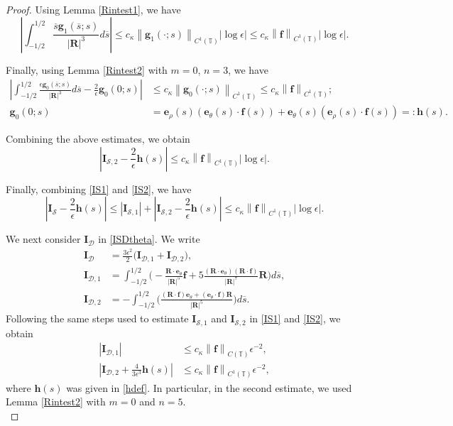 \documentclass[11pt]{article}
\numberwithin{equation}{section}
\newcommand{\T}{\mathbb{T}}
\newcommand{\bars}{\overline s}
\newcommand{\be}{\bm{e}}
\newcommand{\abs}[1]{\left\lvert #1 \right\rvert}
\newcommand{\norm}[1]{\left\lVert #1 \right\rVert}
\newcommand{\mc}[1]{\mathcal{#1}}
\theoremstyle{definition}
\begin{document}
\begin{proof}
Using Lemma \ref{Rintest1}, we have
\[ \abs{\int_{-1/2}^{1/2} \frac{\bars \bm{g}_1(\bars;s)}{\abs{\bm{R}}^3}d\bars}
\le c_\kappa\norm{\bm{g}_1(\cdot;s)}_{C^1(\T)}\abs{\log \epsilon}\le c_\kappa\norm{\bm{f}}_{C^1(\T)}\abs{\log \epsilon}. \]

Finally, using Lemma \ref{Rintest2} with $m=0$, $n=3$, we have 
\begin{equation}\label{hdef}
\begin{split}
\abs{\int_{-1/2}^{1/2} \frac{\epsilon \bm{g}_0(\bars;s)}{\abs{\bm{R}}^3}d\bars - \frac{2}{\epsilon}\bm{g}_0(0; s)}
&\le c_\kappa\norm{\bm{g}_0(\cdot;s)}_{C^1(\T)}\le c_\kappa\norm{\bm{f}}_{C^1(\T)};\\
\bm{g}_0(0;s)&=\be_\rho(s)(\be_\theta(s)\cdot \bm{f}(s))+\be_\theta(s)(\be_\rho(s)\cdot \bm{f}(s)) =: \bm{h}(s).
\end{split}
\end{equation}

Combining the above estimates, we obtain
\begin{equation}\label{IS2}
\abs{\bm{I}_{\mc{S},2}-\frac{2}{\epsilon}\bm{h}(s)}\le c_\kappa\norm{\bm{f}}_{C^1(\T)}\abs{\log\epsilon}.
\end{equation}

Finally, combining \eqref{IS1} and \eqref{IS2}, we have
\begin{equation}\label{ISh}
\abs{\bm{I}_{\mc{S}}-\frac{2}{\epsilon}\bm{h}(s)}\le 
\abs{\bm{I}_{\mc{S},1}}+\abs{\bm{I}_{\mc{S},2}-\frac{2}{\epsilon}\bm{h}(s)}\le
c_\kappa\norm{\bm{f}}_{C^1(\T)}\abs{\log\epsilon}.
\end{equation}

We next consider $\bm{I}_{\mc{D}}$ in \eqref{ISDtheta}. We write
\begin{equation}\label{IDdef}
\begin{split}
\bm{I}_{\mc{D}}&=\frac{3\epsilon^2}{2}\big(\bm{I}_{\mc{D},1}+\bm{I}_{\mc{D},2} \big),\\
\bm{I}_{\mc{D},1}&=\int_{-1/2}^{1/2} \bigg(-\frac{\bm{R}\cdot\be_\theta}{\abs{\bm{R}}^5}\bm{f}+5\frac{(\bm{R}\cdot\be_\theta)(\bm{R}\cdot\bm{f})}{\abs{\bm{R}}^7}\bm{R} \bigg)d\bars,\\
\bm{I}_{\mc{D},2} &= -\int_{-1/2}^{1/2} \bigg(\frac{(\bm{R}\cdot \bm{f})\be_\theta+(\be_\theta \cdot \bm{f})\bm{R}}{\abs{\bm{R}}^5}\bigg) d\bars.
\end{split}
\end{equation}
Following the same steps used to estimate $\bm{I}_{\mc{S},1}$ and $\bm{I}_{\mc{S},2}$ in \eqref{IS1} and \eqref{IS2}, we obtain
\begin{align*}
\abs{\bm{I}_{\mc{D},1}}&\le c_\kappa\norm{\bm{f}}_{C(\T)}\epsilon^{-2},\\
\abs{\bm{I}_{\mc{D},2}+\frac{4}{3\epsilon^3}\bm{h}(s)}&\le c_\kappa\norm{\bm{f}}_{C^1(\T)}\epsilon^{-2},
\end{align*}
where $\bm{h}(s)$ was given in \eqref{hdef}. In particular, in the second estimate, we used Lemma \ref{Rintest2} with $m=0$ and $n=5$. \\


\end{proof}
\end{document}
